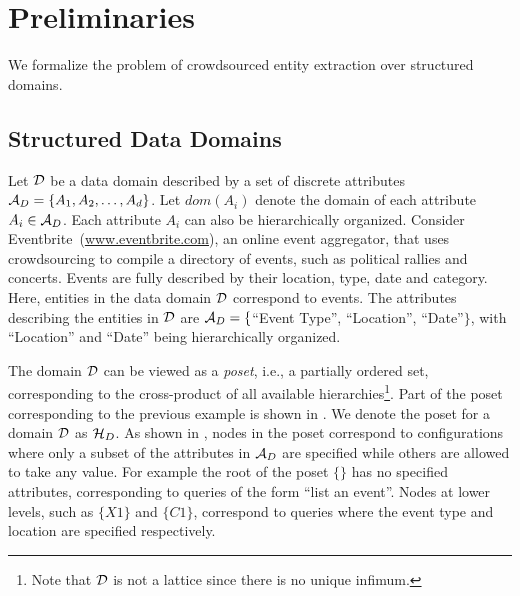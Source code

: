 
\section{Preliminaries}
\label{sec:prelims}
We formalize the problem of crowdsourced entity extraction over structured domains. %

\subsection{Structured Data Domains}
\label{sec:data-domain}

Let $\mathcal{D}$ be a data domain described by a set of discrete attributes $\mathcal{A}_D = \{A_1, A_2, \dots, A_d\}$. Let $dom(A_i)$ denote the domain of each attribute $A_i  \in \mathcal{A}_D$. 
Each attribute $A_i$ can also be hierarchically organized. 
Consider Eventbrite~(\url{www.eventbrite.com}), 
an online event aggregator, that uses crowdsourcing 
to compile a directory of events, such as political rallies and concerts. Events are fully described by their location, type, date and category. Here, entities in the data domain $\mathcal{D}$ correspond to events. The attributes describing the entities in $\mathcal{D}$ are $\mathcal{A}_D = \{$``Event Type'', ``Location'', ``Date''$\}$, with ``Location'' and ``Date'' being hierarchically organized.

The domain $\mathcal{D}$ can be viewed as a {\em poset}, i.e., a partially ordered set, corresponding to the cross-product of all available hierarchies\footnote{Note that $\mathcal{D}$ is not a lattice since there is no unique infimum.}. Part of the poset corresponding to the previous example is shown in . We denote the poset for a domain $\mathcal{D}$ as $\mathcal{H}_D$. As shown in , nodes in the poset correspond to configurations where only a subset of the attributes in $\mathcal{A}_D$ are specified while others are allowed to take any value. For example the root of the poset $\{\}$ has no specified attributes, corresponding to queries of the form ``list an event''. Nodes at lower levels, such as $\{X1\}$ and $\{C1\}$, correspond to queries where the event type and location are specified respectively. 

